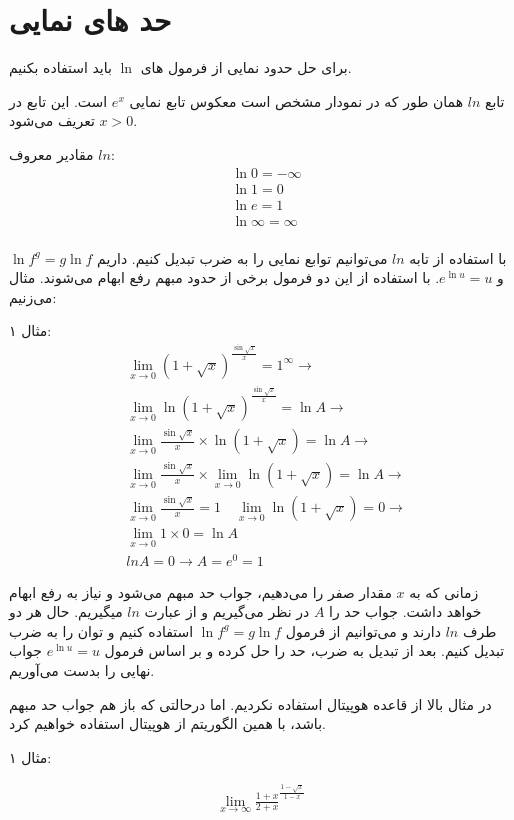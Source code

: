\section{حد های نمایی}

برای حل حدود نمایی از فرمول های $\ln$ باید استفاده بکنیم.



تابع $ln$ همان طور که در نمودار مشخص است معکوس تابع نمایی $e^x$ است. این تابع در $x > 0$ تعریف می‌شود.

مقادیر معروف $ln$:
\begin{align*}
&\ln 0 = -\infty \\
&\ln 1 = 0 \\
&\ln e = 1 \\
&\ln \infty = \infty \\
\end{align*}

با استفاده از تابه $ln$ می‌توانیم توابع نمایی را به ضرب تبدیل کنیم. داریم $\ln f^g = g\ln f$ و $e^{\ln u} = u$.
با استفاده از این دو فرمول برخی از حدود مبهم رفع ابهام می‌شوند. مثال می‌زنیم:

مثال ۱:
\begin{align*}
&\lim_{x\to 0} (1 + \sqrt{x})^{\frac{\sin\sqrt{x}}{x}} = 1^{\infty} \to \\
&\lim_{x\to 0} \ln (1 + \sqrt{x})^{\frac{\sin\sqrt{x}}{x}} = \ln A \to \\
&\lim_{x\to 0} {\frac{\sin\sqrt{x}}{x}} \times \ln(1 + \sqrt{x}) = \ln A \to \\
&\lim_{x\to 0} {\frac{\sin\sqrt{x}}{x}} \times \lim_{x\to 0} \ln(1 + \sqrt{x}) = \ln A \to \\
&\lim_{x\to 0} {\frac{\sin\sqrt{x}}{x}} = 1 \quad \lim_{x\to 0} \ln(1 + \sqrt{x}) = 0 \to \\
&\lim_{x\to 0} 1 \times 0 = \ln A \\
&ln A = 0 \to A = e^0 = 1
\end{align*}

زمانی که به $x$ مقدار صفر را می‌دهیم، جواب حد مبهم می‌شود و نیاز به رفع ابهام خواهد داشت.
جواب حد را $A$ در نظر می‌گیریم و از عبارت $ln$ میگیریم. حال هر دو طرف $ln$ دارند و می‌توانیم از فرمول $\ln f^g = g\ln f$ استفاده کنیم و توان را به ضرب تبدیل کنیم.
بعد از تبدیل به ضرب، حد را حل کرده و بر اساس فرمول $e^{\ln u} = u$ جواب نهایی را بدست می‌آوریم.

در مثال بالا از قاعده هوپیتال استفاده نکردیم. اما درحالتی که باز هم جواب حد مبهم باشد، با همین الگوریتم از هوپیتال استفاده خواهیم کرد.

مثال ۱:


\begin{align*}
\lim_{x\to\infty} \frac{1+x}{2+x}^{\frac{1-\sqrt{x}}{1-x}}
\end{align*}